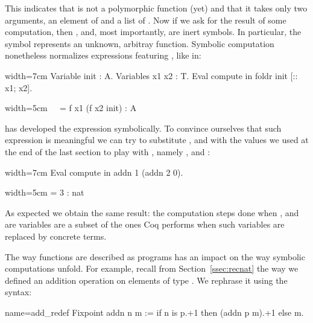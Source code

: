 This indicates that  is not a polymorphic function (yet)
and that it takes only two arguments, an element of  and
a list of . Now if we ask for the result of some computation,
then ,  and, most importantly,  are inert symbols.
In particular, the symbol  represents an unknown, arbitray
function. Symbolic computation nonetheless normalizes expressions
featuring , like in:

\begin{coq}{}{width=7cm}
Variable init : A.
Variables x1 x2 : T.
Eval compute in foldr init [:: x1; x2].
\end{coq}
\begin{coqout}{}{width=5cm}
$~$
$~$
= f x1 (f x2 init) : A
\end{coqout}

\Coq{} has developed the expression symbolically.  To convince
ourselves that such expression is meaningful
we can try to substitute ,  and  with the
values we used at the end of the last section to
play with , namely ,  and :

\begin{coq}{}{width=7cm}
Eval compute in addn 1 (addn 2 0).
\end{coq}
\begin{coqout}{}{width=5cm}
 = 3 : nat
\end{coqout}

As expected we obtain the same result: the computation steps
done when ,  and  are variables are a subset of
the ones Coq performs when such variables are replaced by concrete
terms.


The way functions are described as programs has an impact on the way
symbolic computations unfold. For example, recall from
Section~\ref{ssec:recnat} the way we defined an addition operation on
elements of type . We rephrase it using the  syntax: %

\begin{coq}{name=add_redef}{}
Fixpoint addn n m := if n is p.+1 then (addn p m).+1 else m.
\end{coq}

